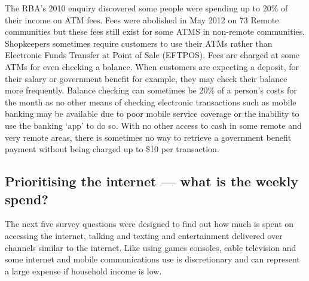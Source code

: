 The RBA's 2010 enquiry discovered some people were spending up to 20\% of their income on ATM fees.\cite{RefWorks:379} 
Fees were abolished in May 2012 on 73 Remote communities but these fees still exist for some ATMS in non-remote communities.
Shopkeepers sometimes require customers to use their ATMs rather than Electronic Funds Transfer at Point of Sale (EFTPOS). Fees are charged at some ATMs for even checking a balance. When customers are expecting a deposit, for their salary or government benefit for example, they may check their balance more frequently. Balance checking can sometimes be 20\% of a person's costs for the month as no other means of checking electronic transactions such as mobile banking may be available due to poor mobile service coverage or the inability to use the banking `app' to do so. With no other access to cash in some remote and very remote areas, there is sometimes no way to retrieve a government benefit payment without being charged up to \$10 per transaction.\cite{RefWorks:378}


\subsection{Prioritising the internet --- what is the weekly spend?}
The next five survey questions were designed to find out how much is spent on accessing the internet, talking and texting and entertainment delivered over channels similar to the internet.  Like using games consoles, cable television and some internet and mobile communications use is discretionary and can represent a large expense if household income is low. 

